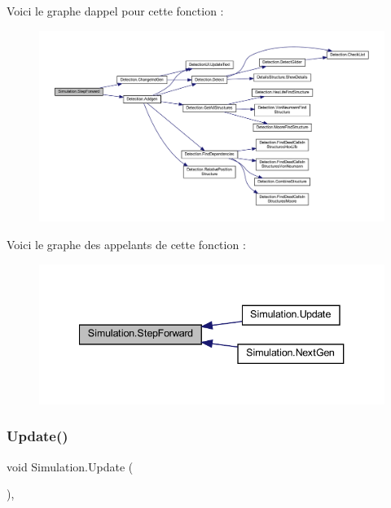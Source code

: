 Voici le graphe d\textquotesingle{}appel pour cette fonction \+:
\nopagebreak
\begin{figure}[H]
\begin{center}
\leavevmode
\includegraphics[width=350pt]{class_simulation_a1ba6581d305c2d60d174e0cffd917719_cgraph}
\end{center}
\end{figure}
Voici le graphe des appelants de cette fonction \+:\nopagebreak
\begin{figure}[H]
\begin{center}
\leavevmode
\includegraphics[width=340pt]{class_simulation_a1ba6581d305c2d60d174e0cffd917719_icgraph}
\end{center}
\end{figure}
\mbox{\label{class_simulation_a8486cde41c003277c1ac75fffeda973b}} 
\subsubsection{\texorpdfstring{Update()}{Update()}}
{\footnotesize\ttfamily void Simulation.\+Update (\begin{DoxyParamCaption}{ }\end{DoxyParamCaption})\hspace{0.3cm}{\ttfamily [inline]}, {\ttfamily [private]}}

